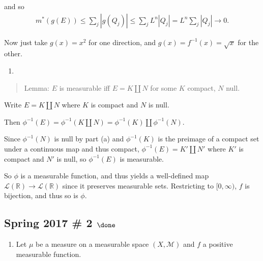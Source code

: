\begin{solution}
and so
\begin{align*}
m^*(g(E)) \leq \sum_j {\left\lvert {g(Q_j)} \right\rvert} \leq \sum_j L^n {\left\lvert {Q_j} \right\rvert} = L^n \sum_j {\left\lvert {Q_j} \right\rvert} \to 0 
.\end{align*}

Now just take \(g(x) = x^2\) for one direction, and
\(g(x) = f^{-1}(x) = \sqrt{x}\) for the other.

\begin{enumerate}
\def\labelenumi{\alph{enumi}.}
\setcounter{enumi}{1}
\tightlist
\item
\end{enumerate}

\begin{quote}
Lemma: \(E\) is measurable iff \(E = K {\textstyle\coprod}N\) for some
\(K\) compact, \(N\) null.
\end{quote}

Write \(E = K {\textstyle\coprod}N\) where \(K\) is compact and \(N\) is
null.

Then
\(\phi^{-1}(E) = \phi^{-1}(K {\textstyle\coprod}N) = \phi^{-1}(K) {\textstyle\coprod}\phi^{-1}(N)\).

Since \(\phi^{-1}(N)\) is null by part (a) and \(\phi^{-1}(K)\) is the
preimage of a compact set under a continuous map and thus compact,
\(\phi^{-1}(E) = K' {\textstyle\coprod}N'\) where \(K'\) is compact and
\(N'\) is null, so \(\phi^{-1}(E)\) is measurable.

So \(\phi\) is a measurable function, and thus yields a well-defined map
\(\mathcal L({\mathbb{R}}) \to \mathcal L({\mathbb{R}})\) since it
preserves measurable sets. Restricting to \([0, \infty)\), \(f\) is
bijection, and thus so is \(\phi\).

\end{solution}

\hypertarget{spring-2017-2-done}{%
\subsection{\texorpdfstring{Spring 2017 \# 2
\(\done\)}{Spring 2017 \# 2 \textbackslash done}}\label{spring-2017-2-done}}

\begin{enumerate}
\def\labelenumi{\alph{enumi}.}
\tightlist
\item
  Let \(\mu\) be a measure on a measurable space \((X, \mathcal M)\) and
  \(f\) a positive measurable function.
\end{enumerate}

